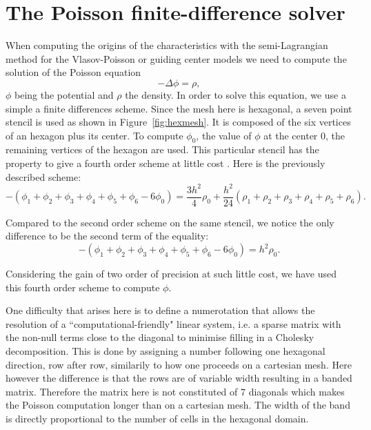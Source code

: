 \documentclass[proc]{edpsmath}
\begin{document}
\section{The Poisson finite-difference solver}
\label{sec:poisson_eqn}


When computing the origins of the characteristics with the semi-Lagrangian method for the Vlasov-Poisson or guiding center models we need to compute the solution of the Poisson equation
\begin{equation*}
	- \Delta \phi = \rho ,
\end{equation*}
 $\phi$ being the potential and $\rho$ the density.
 In order to solve this equation, we use a simple a finite differences scheme. Since the mesh here is hexagonal, a seven point stencil is used as shown in Figure~\ref{fig:hexmesh}. It is composed of the six vertices of an hexagon plus its center. To compute  $\phi_0$, the value of $\phi$ at the center $0$,  the remaining vertices of the hexagon are used. 
 This particular stencil has the property to give a fourth order scheme at little cost \cite{poisson}. Here is the previously described scheme:
\begin{equation*}
-(\phi_1 + \phi_2 + \phi_3 + \phi_4 +\phi_5 + \phi_6 - 6 \phi_0)  = \frac{3h^2}{4} \rho_0 + \frac{h^2}{24}(\rho_1+\rho_2+\rho_3+\rho_4+\rho_5+\rho_6).
\end{equation*} 

Compared to the second order scheme on the same stencil, we notice the only difference to be the second term of the equality:  
\begin{equation*}
-(\phi_1 + \phi_2 + \phi_3 + \phi_4 +\phi_5 + \phi_6 - 6 \phi_0)  = h^2 \rho_0.
\end{equation*} 

Considering the gain of two order of precision at such little cost, we have used this fourth order scheme to compute $\phi$.

 \rmrk One difficulty that arises here is to define a numerotation that allows the resolution of a ``computational-friendly" linear system, i.e. a sparse matrix with the non-null terms close to the diagonal to minimise filling in a Cholesky decomposition. This is done by assigning a number following one hexagonal direction, row after row, similarily to how one proceeds on a cartesian mesh. Here however the difference is that the rows are of variable width resulting in a banded matrix. Therefore the matrix here is not constituted of 7 diagonals which makes the Poisson computation longer than on a cartesian mesh. The width of the band is directly proportional to the number of cells in the hexagonal domain.  
\end{document}
